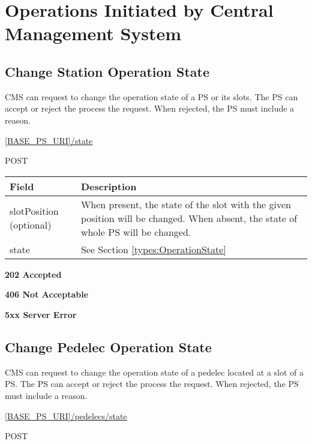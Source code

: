 \section{Operations Initiated by Central Management System}
\label{cms:main}
\subsection{Change Station Operation State}

\acs{CMS} can request to change the operation state of a \acs{PS} or its slots. The \acs{PS} can accept or reject the process the request. When rejected, the \acs{PS} must include a reason.

 \url{[BASE_PS_URI]/state}

 POST

\begin{table}[!h]
\vspace{-7mm}
\begin{tabularx}{\linewidth}{ | l | X | }
  \hline
  \rowcolor{table-head}
  Field & Description \\
  \hline
  slotPosition (optional) 		& When present, the state of the slot with the given position will be changed. When absent, the state of whole \acs{PS} will be changed. \\
  state 					& See Section \ref{types:OperationState} \\
    \hline
\end{tabularx}
\end{table}

 \textbf{202 Accepted}

 \textbf{406 Not Acceptable}

\textbf{5xx Server Error}

\subsection{Change Pedelec Operation State}

\acs{CMS} can request to change the operation state of a pedelec located at a slot of a \acs{PS}. The \acs{PS} can accept or reject the process the request. When rejected, the \acs{PS} must include a reason.

 \url{[BASE_PS_URI]/pedelecs/state}

 POST

